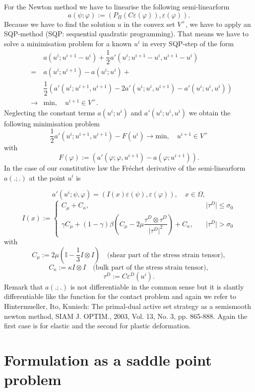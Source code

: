 \documentclass{article}
\begin{document}
For the Newton method we have to linearise the following semi-linearform
$$a(\psi;\varphi) := \left(P_{\Pi}(C\varepsilon(\varphi)),\varepsilon(\varphi)\right).$$
Because we have to find the solution $u$ in the convex set $V^+$, we have to
apply an SQP-method (SQP: sequential quadratic programming). That means we have
to solve a minimisation problem for a known $u^i$ in every SQP-step of the form
\begin{eqnarray*}
 & & a(u^{i};u^{i+1} - u^i) + \dfrac{1}{2}a'(u^i;u^{i+1} - u^i,u^{i+1} - u^i)\\
 &=&  a(u^i;u^{i+1}) -  a(u^i;u^i) +\\
 & & \dfrac{1}{2}\left( a'(u^i;u^{i+1},u^{i+1}) - 2a'(u^i;u^i,u^{i+1}) - a'(u^i;u^i,u^i)\right)\\
 &\rightarrow& \textrm{min},\quad u^{i+1}\in V^+.
\end{eqnarray*}
Neglecting the constant terms $ a(u^i;u^i)$ and $ a'(u^i;u^i,u^i)$ we obtain the
following minimisation problem $$\dfrac{1}{2} a'(u^i;u^{i+1},u^{i+1}) - F(u^i)\rightarrow \textrm{min},\quad u^{i+1}\in V^+$$ with
$$F(\varphi) := \left(a'(\varphi;\varphi,u^{i+1}) -  a(\varphi;u^{i+1}) \right).$$
In the case of our constitutive law the Fr\'echet derivative of the
semi-linearform $a(.;.)$ at the point $u^i$ is

$$a'(u^i;\psi,\varphi) =
(I(x)\varepsilon(\psi),\varepsilon(\varphi)),\quad x\in\Omega,$$ $$
I(x) := \begin{cases}
C_{\mu} + C_{\kappa}, &
\quad \vert \tau^D \vert \leq \sigma_0\\
\gamma C_{\mu} + (1-\gamma)\beta\left(C_{\mu} -
2\mu\dfrac{\tau^D\otimes\tau^D}{\vert\tau^D\vert^2}\right) + C_{\kappa}, &\quad
\vert \tau^D \vert > \sigma_0
\end{cases}
$$
with
$$C_{\mu} := 2\mu\left(\mathbb{I}  - \dfrac{1}{3} I\otimes
I\right)\quad\text{(shear part of the stress strain tensor)},$$
$$C_{\kappa} := \kappa I\otimes I\quad\text{(bulk part of the stress strain
tensor)},$$
$$\tau^D := C\varepsilon^D(u^i).$$
Remark that $a(.;.)$ is not differentiable in the common sense but it is
slantly differentiable like the function for the contact problem and again we refer to
Hintermueller, Ito, Kunisch: The primal-dual active set strategy as a semismooth newton method, SIAM J. OPTIM., 2003, Vol. 13, No. 3, pp. 865-888.
Again the first case is for elastic and the second for plastic deformation.

\section{Formulation as a saddle point problem}
\end{document}
